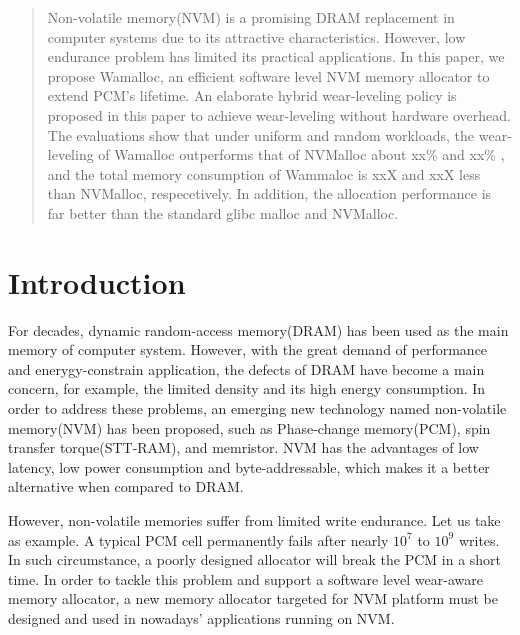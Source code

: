 \documentclass{vldb}
\begin{document}
\maketitle

\begin{abstract}
Non-volatile memory(NVM) is a promising DRAM replacement in computer systems due to its attractive characteristics.
However, low endurance problem has limited its practical applications.
In this paper, we propose Wamalloc, an efficient software level NVM memory allocator to extend PCM's lifetime.
An elaborate hybrid wear-leveling policy is proposed in this paper to achieve wear-leveling without hardware overhead.
The evaluations show that under uniform and random workloads,
the wear-leveling of Wamalloc outperforms that of NVMalloc about xx\% and xx\% ,
and the total memory consumption of Wammaloc is xxX and xxX less than NVMalloc, respecetively.
In addition, the allocation performance is far better than the standard glibc malloc and NVMalloc.
\end{abstract}

\section{Introduction}

For decades, dynamic random-access memory(DRAM) has been used as the main memory of computer system.
However, with the great demand of performance and enerygy-constrain application, the defects of DRAM have become a main concern,
for example, the limited density and its high energy consumption. 
In order to address these problems, an emerging new technology named non-volatile memory(NVM) has been proposed, such as Phase-change memory(PCM), spin transfer torque(STT-RAM), and memristor. 
NVM has the advantages of low latency, low power consumption and byte-addressable, which makes it a better alternative when compared  to DRAM.

However, non-volatile memories suffer from limited write endurance. 
Let us take  as example. A typical PCM cell permanently fails after nearly $10^7$ to $10^9$ writes. 
In such circumstance, a poorly designed allocator will break the PCM in a short time. 
In order to tackle this problem and support a software level wear-aware memory allocator, a new memory allocator targeted for NVM platform must be designed and used in nowadays’ applications running on NVM.
\end{document}
